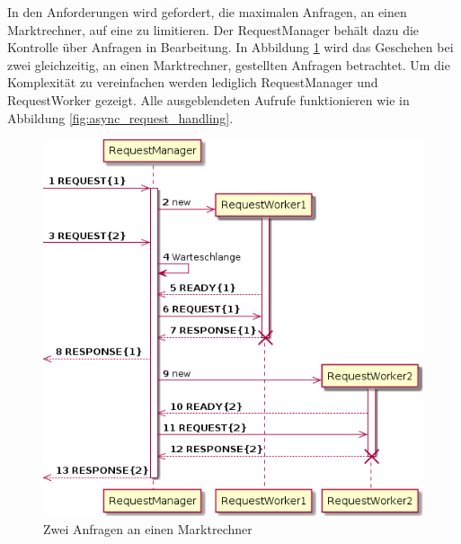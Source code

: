 \documentclass{article}
\begin{document}
In den Anforderungen wird gefordert, die maximalen Anfragen, an einen Marktrechner, auf eine zu limitieren. Der RequestManager behält dazu die Kontrolle über Anfragen in Bearbeitung. In Abbildung \ref{fig:async_request_handling_multi_single} wird das Geschehen bei zwei gleichzeitig, an einen Marktrechner, gestellten Anfragen betrachtet. Um die Komplexität zu vereinfachen werden lediglich RequestManager und RequestWorker gezeigt. Alle ausgeblendeten Aufrufe funktionieren wie in Abbildung \ref{fig:async_request_handling}.

\begin{figure}[h]
\centering
\includegraphics[scale=0.4]{praktikumsbericht_004.png}
\caption{Zwei Anfragen an einen Marktrechner}
\label{fig:async_request_handling_multi_single}
\end{figure}
\end{document}
